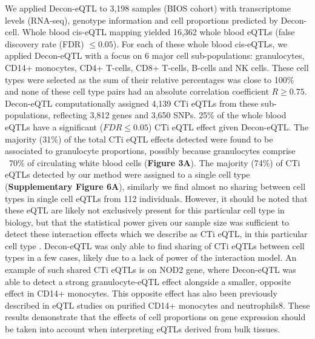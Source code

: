 We applied Decon-eQTL to 3,198 samples (BIOS cohort) with transcriptome levels (RNA-seq), genotype information and cell proportions predicted by Decon-cell. Whole blood cis-eQTL mapping yielded 16,362 whole blood eQTLs (false discovery rate (FDR) $\leq 0.05$). For each of these whole blood cis-eQTLs, we applied Decon-eQTL with a focus on 6 major cell sub-populations: granulocytes, CD14+ monocytes, CD4+ T-cells, CD8+ T-cells, B-cells and NK cells. These cell types were selected as the sum of their relative percentages was close to 100\% and none of these cell type pairs had an absolute correlation coefficient $R \geq 0.75$. Decon-eQTL computationally assigned 4,139 CTi eQTLs from these sub-populations, reflecting 3,812 genes and 3,650 SNPs. 25\% of the whole blood eQTLs have a significant ($FDR \leq 0.05$) CTi eQTL effect given Decon-eQTL. The majority (31\%) of the total CTi eQTL effects detected were found to be associated to granulocyte proportions, possibly because granulocytes comprise ~70\% of circulating white blood cells (\textbf{Figure 3A}). The majority (74\%) of CTi eQTLs detected by our method were assigned to a single cell type (\textbf{Supplementary Figure 6A}), similarly we find almost no sharing between cell types in single cell eQTLs from 112 individuals. However, it should be noted that these eQTL are likely not exclusively present for this particular cell type in biology, but that the statistical power given our sample size was sufficient to detect these interaction effects which we describe as CTi eQTL, in this particular cell type . Decon-eQTL was only able to find sharing of CTi eQTLs between cell types in a few cases, likely due to a lack of power of the interaction model. An example of such shared CTi eQTLs is on NOD2 gene, where Decon-eQTL was able to detect a strong granulocyte-eQTL effect alongside a smaller, opposite effect in CD14+ monocytes. This opposite effect has also been previously described in eQTL studies on purified CD14+ monocytes and neutrophils8. These results demonstrate that the effects of cell proportions on gene expression should be taken into account when interpreting eQTLs derived from bulk tissues.

